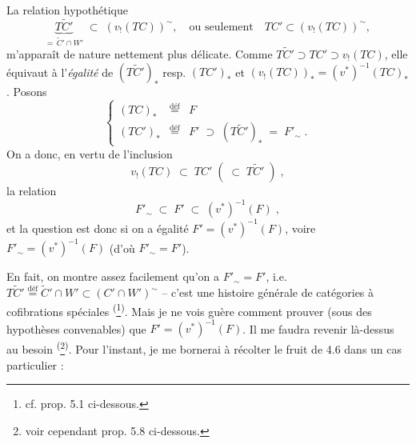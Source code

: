 \documentclass[11pt]{article}
\newcommand{\msp}[1]{\marginpar{\footnotesize [#1]}}
\newcommand{\defeq}{\overset{\text{déf}}{=}}
\newcommand{\cl}{^{\sim}}%
\begin{document}
La relation hypothétique
\[
\underbrace{T\tilde{C}'}_{=\,\tilde{C}'\cap W'} \;\subset\; (v_{!}(TC))\cl, \quad \text{ou seulement} \quad TC' \subset (v_{!}(TC))\cl,
\tag*{$(*)$}
\]
m'apparaît de nature nettement plus délicate. Comme $T\tilde{C}' \supset TC' \supset v_{!}(TC)$, elle équivaut à l'\textit{égalité} de $(T\tilde{C}')_{*}$ resp. $(TC')_{*}$ et $(v_{!}(TC))_{*} = (v^{*})^{-1}(TC)_{*}$. Posons
\[
\left\{
\begin{array}{lcl}
(TC)_{*} & \defeq & F \\
(TC')_{*} & \defeq & F' \;\supset\; (T\tilde{C}')_{*} \;=\; F'_{\sim} \; .
\end{array}
\right.
\tag*{(4.7.5)}
\]
On a donc, en vertu de l'inclusion
\[
v_{!}(TC) \;\subset\; TC' \; ( \;\subset\; T\tilde{C}' \; ) \; ,
\]
la relation
\[
F'_{\sim} \;\subset\; F' \;\subset\; (v^{*})^{-1}(F) \; ,
\tag*{(4.7.6)}
\]
et la question est donc si on a égalité $F' = (v^{*})^{-1}(F)$, voire $F'_{\sim} = (v^{*})^{-1}(F)$ (d'où $F'_{\sim} = F'$).

\msp{page 81}

En fait, on montre assez facilement qu'on a $F'_{\sim} = F'$, i.e. $T\tilde{C}' \defeq \tilde{C}' \cap W' \subset (C' \cap W')\cl$ -- c'est une histoire générale de catégories à cofibrations spéciales \textsuperscript{(}\footnote[21]{cf. prop. 5.1 ci-dessous.}\textsuperscript{)}. Mais je ne vois guère comment prouver (sous des hypothèses convenables) que $F' = (v^{*})^{-1}(F)$. Il me faudra revenir là-dessus au besoin \textsuperscript{(}\footnote[22]{voir cependant prop. 5.8 ci-dessous.}\textsuperscript{)}. Pour l'instant, je me bornerai à récolter le fruit de 4.6 dans un cas particulier :
\end{document}
